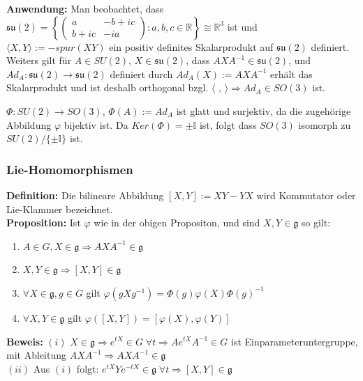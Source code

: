 \documentclass[11pt]{beamer}
\begin{document}
\begin{frame}
	\textbf{Anwendung:}
	Man beobachtet, dass $\mathfrak{su(2)} = \left\{ \left( \begin{matrix}
	a  	& -b+ic\\
	b+ic	& -ia
	\end{matrix}\right): a,b,c \in \mathbb{R} \right\} \cong \mathbb{R}^3$
	ist \pause
	und
	$\langle X, Y \rangle:= -spur(XY)$ ein positiv definites Skalarprodukt auf $\mathfrak{su(2)}$\pause
	definiert.
	Weiters gilt für $A\in SU(2)$, $X\in \mathfrak{su(2)}$, dass $AXA^{-1} \in \mathfrak{su(2)}$,\pause
	 und
	$Ad_A:\mathfrak{su(2)} \to \mathfrak{su(2)}$ definiert durch $Ad_A(X) := AXA^{-1}$ erhält das Skalarprodukt und ist deshalb orthogonal bzgl. $\langle \,\, , \, \rangle \Rightarrow Ad_A \in SO(3)$ ist. \\ \pause


	$\Phi: SU(2) \to SO(3)$, $\Phi(A) := Ad_A$ ist glatt und surjektiv, da die zugehörige Abbildung $\varphi$ bijektiv ist. \pause
	Da $Ker(\Phi) = {\pm \mathbb{I}}$ ist, folgt dass $SO(3)$ isomorph zu $SU(2)/\{\pm\mathbb{I}\}$ ist.

\end{frame}

\begin{frame}
	\frametitle{Lie-Homomorphismen}
	\textbf{Definition:}
	Die bilineare Abbildung $[X, Y] := XY - YX$ wird Kommutator oder Lie-Klammer bezeichnet.\\[1em] \pause
	\textbf{Proposition:}
	Ist $\varphi$ wie in der obigen Propositon, und sind $X, Y \in \mathfrak{g}$ so gilt: \pause
	\begin{enumerate}[label = $(\roman*)$]
		\item $A\in G, X \in \mathfrak g \Rightarrow AXA^{-1} \in \mathfrak g$ \pause

		\item $X, Y \in \mathfrak g \Rightarrow [X,Y] \in \mathfrak g$ \pause

		\item $\forall X \in \mathfrak{g}, g\in G$ gilt $\varphi(gXg^{-1}) = \Phi(g) \varphi(X) \Phi(g)^{-1}$ \pause

		\item $\forall X, Y \in \mathfrak{g}$ gilt $\varphi([X,Y]) = [\varphi(X), \varphi(Y)]$ \pause
	\end{enumerate}

	\textbf{Beweis:}
	$(i)$ $X\in \mathfrak g \Rightarrow e^{tX}\in G\; \forall t \Rightarrow Ae^{tX}A^{-1} \in G$ ist Einparameteruntergruppe, mit Ableitung $AXA^{-1} \Rightarrow AXA^{-1} \in \mathfrak g$ \\[1em]\pause
	$(ii)$ Aus $(i)$ folgt: $e^{tX}Ye^{-tX} \in \mathfrak g\; \forall t \Rightarrow [X,Y] \in \mathfrak g$

\end{frame}
\end{document}
